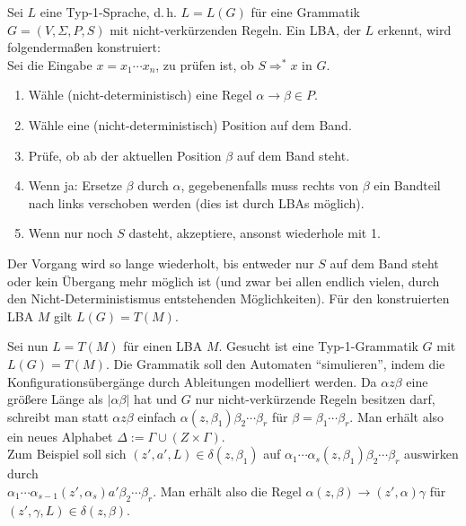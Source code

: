 \begin{Beweis}
    Sei $L$ eine Typ-1-Sprache, d.\,h. $L = L(G)$ für eine Grammatik
    $G = (V, \Sigma, P, S)$ mit nicht-verkürzenden Regeln.
    Ein LBA, der $L$ erkennt, wird folgendermaßen konstruiert:\\
    Sei die Eingabe $x = x_1 \dotsb x_n$, zu prüfen ist, ob
    $S \Rightarrow^\ast x$ in $G$.
    \begin{enumerate}
        \item
        Wähle (nicht-deterministisch) eine Regel
        $\alpha \rightarrow \beta \in P$.

        \item
        Wähle eine (nicht-deterministisch) Position auf dem Band.

        \item
        Prüfe, ob ab der aktuellen Position $\beta$ auf dem Band steht.

        \item
        Wenn ja: Ersetze $\beta$ durch $\alpha$,
        gegebenenfalls muss rechts von $\beta$ ein Bandteil nach links
        verschoben werden (dies ist durch LBAs möglich).

        \item
        Wenn nur noch $S$ dasteht, akzeptiere, ansonst wiederhole mit 1.
    \end{enumerate}
    Der Vorgang wird so lange wiederholt, bis entweder nur $S$ auf dem
    Band steht oder kein Übergang mehr möglich ist
    (und zwar bei allen endlich vielen, durch den
    Nicht-Deterministismus entstehenden Möglichkeiten).
    Für den konstruierten LBA $M$ gilt $L(G) = T(M)$.

    Sei nun $L = T(M)$ für einen LBA $M$.
    Gesucht ist eine Typ-1-Grammatik $G$ mit $L(G) = T(M)$.
    Die Grammatik soll den Automaten "`simulieren"', indem die
    Konfigurationsübergänge durch Ableitungen modelliert werden.
    Da $\alpha z \beta$ eine größere Länge als $|\alpha \beta|$ hat und
    $G$ nur nicht-verkürzende Regeln besitzen darf,
    schreibt man statt $\alpha z \beta$ einfach
    $\alpha (z, \beta_1) \beta_2 \dotsb \beta_r$ für
    $\beta = \beta_1 \dotsb \beta_r$.
    Man erhält also ein neues Alphabet
    $\Delta := \Gamma \cup (Z \times \Gamma)$.\\
    Zum Beispiel soll sich $(z', a', L) \in \delta(z, \beta_1)$
    auf $\alpha_1 \dotsb \alpha_s (z, \beta_1) \beta_2 \dotsb \beta_r$
    auswirken durch\\
    $\alpha_1 \dotsb \alpha_{s-1} (z', \alpha_s) a' \beta_2 \dotsb \beta_r$.
    Man erhält also die Regel
    $\alpha (z, \beta) \rightarrow (z', \alpha) \gamma$
    für $(z', \gamma, L) \in \delta(z, \beta)$.


\end{Beweis}
